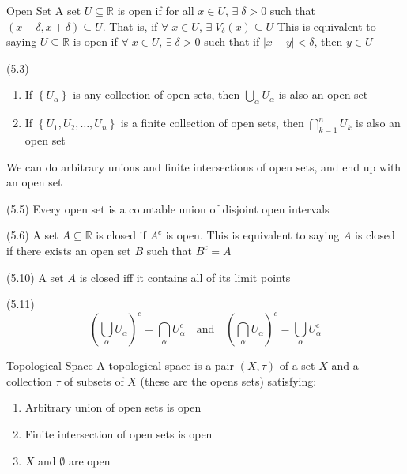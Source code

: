 \documentclass[12pt]{article}
\begin{document}
\begin{definition}{Open Set}{}
    A set $ U \subseteq \mathbb{R} $ is open if for all $ x \in U $, $ \exists \; \delta > 0 $ such that $ \left( x - \delta, x + \delta \right) \subseteq U $. That is, if $ \forall \; x \in U $, $ \exists \; V_\delta \left( x \right) \subseteq U $
    \medskip
    \newline
    This is equivalent to saying $ U \subseteq \mathbb{R} $ is open if $ \forall \; x \in U $, $ \exists \; \delta > 0 $ such that if $ | x - y | < \delta $, then $ y \in U $
\end{definition}
\begin{proposition}{(5.3)}{}
    \begin{enumerate}[label = {(\roman*)}]
        \item If $ \left\{ U_\alpha \right\} $ is any collection of open sets, then $ \bigcup\limits_\alpha U_\alpha $ is also an open set
        \item If $ \left\{ U_1, U_2, \dots, U_n \right\} $ is a finite collection of open sets, then $ \bigcap\limits_{k = 1}^n U_k $ is also an open set
    \end{enumerate}
    We can do arbitrary unions and finite intersections of open sets, and end up with an open set
\end{proposition}
\begin{theorem}{(5.5)}{}
    Every open set is a countable union of disjoint open intervals
\end{theorem}
\begin{definition}{(5.6)}{}
    A set $ A \subseteq \mathbb{R} $ is closed if $ A^c $ is open.
    \medskip
    \newline
    This is equivalent to saying $ A $ is closed if there exists an open set $ B $ such that $ B^c = A $
\end{definition}
\begin{theorem}{(5.10)}{}
    A set $ A $ is closed iff it contains all of its limit points
\end{theorem}
\begin{fact}{(5.11)}{}
    \[ \left( \bigcup_\alpha U_\alpha \right)^c = \bigcap_\alpha U_\alpha^c \quad \text{and} \quad \left( \bigcap_\alpha U_\alpha \right)^c = \bigcup_\alpha U_\alpha^c \]
\end{fact}
\begin{definition}{Topological Space}{}
    A topological space is a pair $ \left( X, \tau \right) $ of a set $ X $ and a collection $ \tau $ of subsets of $ X $ (these are the opens sets) satisfying:
    \begin{enumerate}
        \item Arbitrary union of open sets is open
        \item Finite intersection of open sets is open
        \item $ X $ and $ \emptyset $ are open
    \end{enumerate}
\end{definition}
\end{document}
